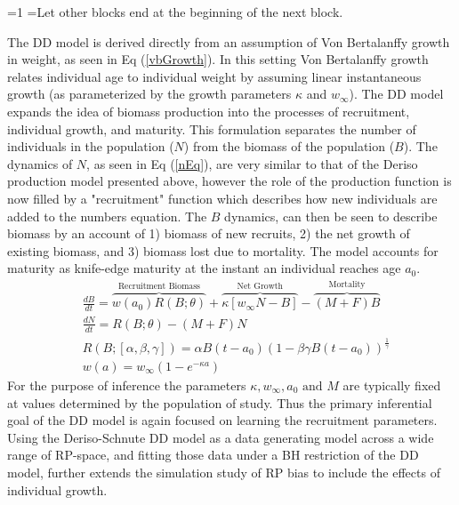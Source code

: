 \documentclass[12pt]{article}
\newcounter{alphasect}
\def\alphainsection{0}
\newenvironment{alphasection}{%
  \ifnum\alphainsection=1%
    \errhelp={Let other blocks end at the beginning of the next block.}
    \errmessage{Nested Alpha section not allowed}
  \fi%
  \setcounter{alphasect}{0}
  \def\alphainsection{1}
}{%
  \setcounter{alphasect}{0}
  \def\alphainsection{0}
}%
\begin{document}
\begin{alphasection}
%
The DD model is derived directly from an assumption of Von Bertalanffy growth  %
in weight, as seen in Eq (\ref{vbGrowth}). In this setting Von Bertalanffy 
growth relates individual age to individual weight by assuming linear 
instantaneous growth (as parameterized by the growth parameters $\kappa$ and 
$w_\infty$). The DD model expands the idea of biomass production into the 
processes of recruitment, individual growth, and maturity. This formulation 
separates the number of individuals in the population ($N$) from the biomass 
of the population ($B$). The dynamics of $N$, as seen in Eq (\ref{nEq}), are 
very similar to that of the Deriso production model presented above, however 
the role of the production function is now filled by a "recruitment" function 
which describes how new individuals are added to the numbers equation. The $B$ dynamics, 
can then be seen to describe biomass by an account of 1) biomass of new 
recruits, 2) the net growth of existing biomass, and 3) biomass lost due to 
mortality. The model accounts for maturity as knife-edge maturity at the 
instant an individual reaches age $a_0$.  
%
\begin{align}%
&\frac{dB}{dt} = \overbrace{w(a_0)R(B;\theta)}^\text{Recruitment Biomass} + \overbrace{\kappa \left[w_\infty N-B\right]}^\text{Net Growth} - \overbrace{(M+F)B}^\text{Mortality} \label{bEq}\\
&\frac{dN}{dt} = R(B;\theta) - (M+F)N \label{nEq}\\
&R(B;[\alpha, \beta, \gamma]) = \alpha B(t-a_0)(1-\beta\gamma B(t-a_0))^{\frac{1}{\gamma}} \label{srr}\\
&w(a) = w_\infty(1-e^{-\kappa a}) \label{vbGrowth}
\end{align}
%
\indent
For the purpose of inference the parameters $\kappa, w_\infty, a_0 \text{ and } M$ are 
typically fixed at values determined by the population of study. Thus the 
primary inferential goal of the DD model is again focused on learning the 
recruitment parameters. Using the Deriso-Schnute DD model as a data generating 
model across a wide range of RP-space, and fitting those data under a BH 
restriction of the DD model, further extends the simulation study of RP bias 
to include the effects of individual growth.


\end{alphasection}
\end{document}

